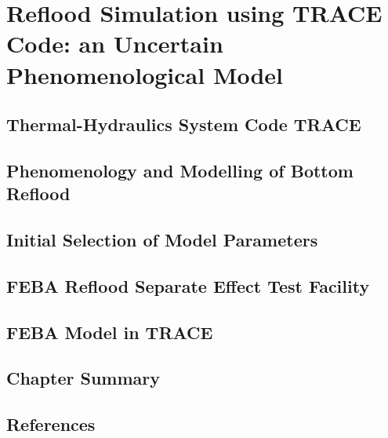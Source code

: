 \chapter{Reflood Simulation using TRACE Code: an Uncertain Phenomenological Model}
\label{ch:reflood_simulation}

\section{Thermal-Hydraulics System Code TRACE}

\section{Phenomenology and Modelling of Bottom Reflood}

\section{Initial Selection of Model Parameters}

\section{FEBA Reflood Separate Effect Test Facility}

\section{FEBA Model in TRACE}

\section{Chapter Summary}

\section{References}